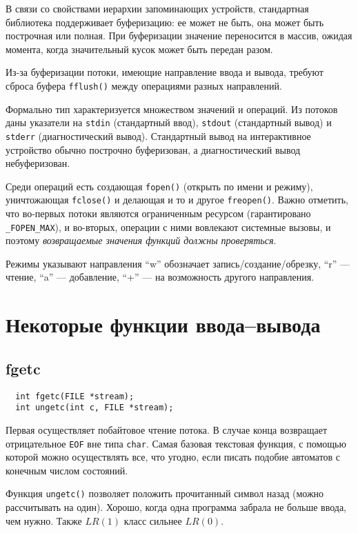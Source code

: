 \documentclass{article}
\begin{document}
В связи со свойствами иерархии запоминающих устройств, стандартная
библиотека поддерживает буферизацию: ее может не быть, она может быть
построчная или полная. При буферизации значение переносится в массив,
ожидая момента, когда значительный кусок может быть передан разом.

Из-за буферизации потоки, имеющие направление ввода и вывода, требуют
сброса буфера \lstinline{fflush()} между операциями разных
направлений. 

Формально тип характеризуется множеством значений и операций. Из
потоков даны указатели на \lstinline{stdin} (стандартный ввод),
\lstinline{stdout} (стандартный вывод) и \lstinline{stderr}
(диагностический вывод). Стандартный вывод на интерактивное устройство
обычно построчно буферизован, а диагностический вывод небуферизован.

Среди операций есть создающая \lstinline{fopen()} (открыть по имени и
режиму), уничтожающая \lstinline{fclose()} и делающая и то и другое
\lstinline{freopen()}. Важно отметить, что во-первых потоки являются
ограниченным ресурсом (гарантировано \lstinline{_FOPEN_MAX}), и
во-вторых, операции с ними вовлекают системные вызовы, и поэтому
\emph{возвращаемые значения функций должны проверяться}.

Режимы указывают направления ``w'' обозначает
запись/создание/обрезку, ``r'' --- чтение, ``a'' --- добавление, ``+''
--- на возможность другого направления.

\section{Некоторые функции ввода--вывода}
\subsection{fgetc}
\begin{lstlisting}
  int fgetc(FILE *stream);
  int ungetc(int c, FILE *stream);
\end{lstlisting}

Первая осуществляет побайтовое чтение потока. В случае конца
возвращает отрицательное \lstinline{EOF} вне типа
\lstinline{char}. Самая базовая текстовая функция, с помощью которой
можно осуществлять все, что угодно, если писать подобие автоматов с
конечным числом состояний.

Функция \lstinline{ungetc()} позволяет положить прочитанный символ
назад (можно рассчитывать на один). Хорошо, когда одна программа
забрала не больше ввода, чем нужно. Также $LR(1)$ класс сильнее
$LR(0)$.
\end{document}
